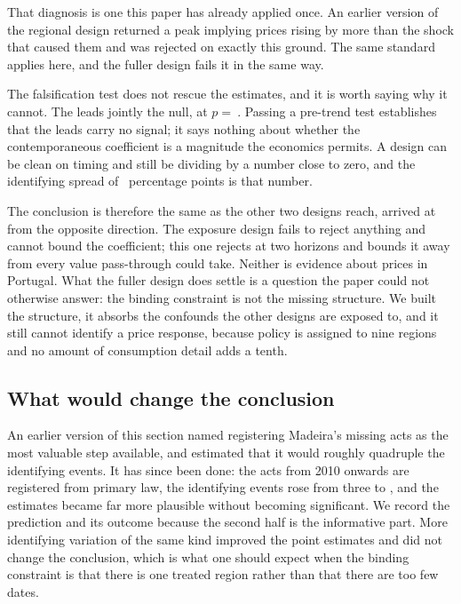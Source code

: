 That diagnosis is one this paper has already applied once. An earlier version of
the regional design returned a peak implying prices rising by more than the
shock that caused them and was rejected on exactly this ground. The same
standard applies here, and the fuller design fails it in the same way.

The falsification test does not rescue the estimates, and it is worth saying why
it cannot. The \StructuralPreTrendLeads{} leads jointly
\StructuralPreTrendRejects{} the null, at $p=\ $\StructuralPreTrendP{}. Passing
a pre-trend test establishes that the leads carry no signal; it says nothing
about whether the contemporaneous coefficient is a magnitude the economics
permits. A design can be clean on timing and still be dividing by a number close
to zero, and the identifying spread of
\StructuralIdentifyingSpread{}~percentage points is that number.

The conclusion is therefore the same as the other two designs reach, arrived at
from the opposite direction. The exposure design fails to reject anything and
cannot bound the coefficient; this one rejects at two horizons and bounds it away
from every value pass-through could take. Neither is evidence about prices in
Portugal. What the fuller design does settle is a question the paper could not
otherwise answer: the binding constraint is not the missing structure. We built
the structure, it absorbs the confounds the other designs are exposed to, and it
still cannot identify a price response, because policy is assigned to nine
regions and no amount of consumption detail adds a tenth.

\subsection{What would change the conclusion}

An earlier version of this section named registering Madeira's missing acts as
the most valuable step available, and estimated that it would roughly quadruple
the identifying events. It has since been done: the acts from 2010 onwards are
registered from primary law, the identifying events rose from three to
\IdentifyingEvents{}, and the estimates became far more plausible without
becoming significant. We record the prediction and its outcome because the
second half is the informative part. More identifying variation of the same kind
improved the point estimates and did not change the conclusion, which is what
one should expect when the binding constraint is that there is one treated
region rather than that there are too few dates.

